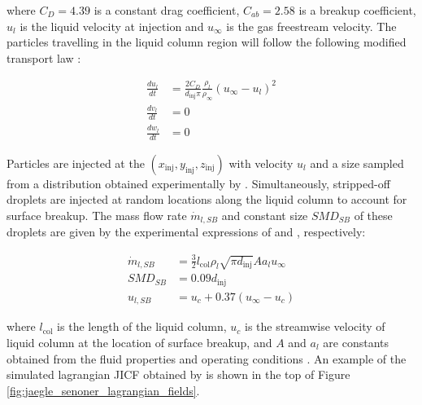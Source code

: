 where $C_D = 4.39$ is a constant drag coefficient, $C_{ab} = 2.58$ is a breakup coefficient, $u_l$ is the liquid velocity at injection and $u_\infty$ is the gas freestream velocity. The particles travelling in the liquid column region will follow the following modified transport law :

\begin{subequations}
\label{eq:momentum_jaegle_model}
\begin{align}
\frac{d u_l}{d t} &= \frac{2 C_D}{d_\mathrm{inj} \pi} \frac{\rho_l}{\rho_\infty} \left( u_\infty - u_l \right)^2  \\
\frac{d v_l}{d t} &= 0 \\
\frac{d w_l}{d t} &= 0 
\end{align}
\end{subequations}

Particles are injected at the $\left( x_\mathrm{inj}, y_\mathrm{inj}, z_\mathrm{inj} \right)$ with  velocity $u_l$ and a size sampled from a distribution obtained experimentally by . Simultaneously, stripped-off droplets are injected at random locations along the liquid column to account for surface breakup. The mass flow rate $\dot{m}_{l,SB}$ and constant size $SMD_{SB}$ of these droplets are given by the experimental expressions of  and , respectively:

\begin{subequations}
\label{eq:surface_breakup_jaegle_model}
\begin{align}
\dot{m}_{l,SB} &= \frac{3}{2} l_\mathrm{col} \rho_l \sqrt{\pi d_\mathrm{inj}} A a_l u_\infty \\
SMD_{SB} &= 0.09 d_\mathrm{inj} \\
u_{l,SB} &= u_c + 0.37 \left( u_\infty - u_c \right)
\end{align}
\end{subequations}

where $l_\mathrm{col}$ is the length of the liquid column, $u_c$ is the streamwise velocity of liquid column at the location of surface breakup, and $A$ and $a_l$ are constants obtained from the fluid properties and operating conditions . An example of the simulated lagrangian JICF obtained by  is shown in the top of Figure \ref{fig:jaegle_senoner_lagrangian_fields}.


